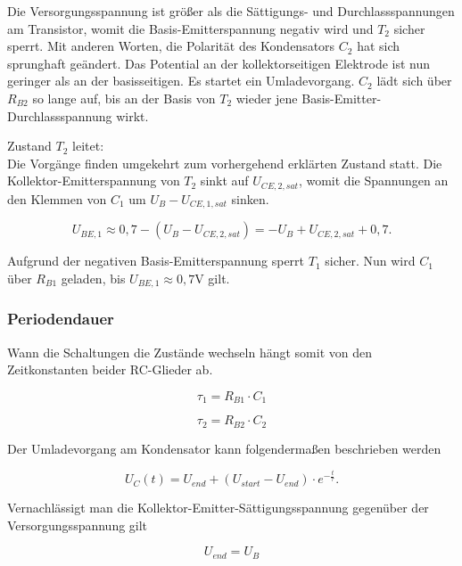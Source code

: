 Die Versorgungsspannung ist größer als die Sättigungs- und Durchlassspannungen am Transistor, womit die Basis-Emitterspannung negativ wird und $T_2$ sicher sperrt. Mit anderen Worten, die Polarität des Kondensators $C_2$ hat sich sprunghaft geändert. Das Potential an der kollektorseitigen Elektrode ist nun geringer als an der basisseitigen. Es startet ein Umladevorgang. $C_2$ lädt sich über $R_{B2}$ so lange auf, bis an der Basis von $T_2$ wieder jene Basis-Emitter-Durchlassspannung wirkt.

Zustand $T_2$ leitet: \\
Die Vorgänge finden umgekehrt zum vorhergehend erklärten Zustand statt. Die Kollektor-Emitterspannung von $T_2$ sinkt auf $U_{CE,2,sat}$, womit die Spannungen an den Klemmen von $C_1$ um $U_B - U_{CE,1,sat}$ sinken. 

\begin{equation}
U_{BE,1} \approx 0,7 - (U_B - U_{CE,2,sat}) = -U_B + U_{CE,2,sat} + 0,7 .
\end{equation}

Aufgrund der negativen Basis-Emitterspannung sperrt $T_1$ sicher. Nun wird $C_1$ über $R_{B1}$ geladen, bis $U_{BE,1} \approx 0,7$V gilt.

\subsubsection{Periodendauer}
Wann die Schaltungen die Zustände wechseln hängt somit von den Zeitkonstanten beider RC-Glieder ab.

\begin{equation}
    \tau_1 = R_{B1} \cdot C_1
\end{equation}

\begin{equation}
    \tau_2 = R_{B2} \cdot C_2
\end{equation}

Der Umladevorgang am Kondensator kann folgendermaßen beschrieben werden

\begin{equation}
    U_{C}(t) = U_{end} + (U_{start} - U_{end}) \cdot e^{-\frac{t}{\tau}}.
\end{equation}

Vernachlässigt man die Kollektor-Emitter-Sättigungsspannung gegenüber der Versorgungsspannung gilt

\begin{equation}
    U_{end} = U_B
\end{equation}

